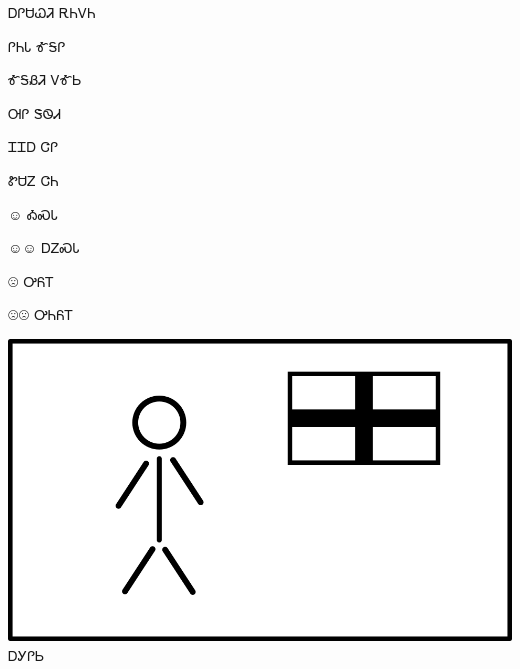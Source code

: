 \documentclass[avery5371]{flashcards}%
\begin{document}

    \begin{flashcard}{\Huge ᎠᎵᏌᏇᏘ}
        \textbf{\Huge} ᎡᏂᏙᏂ
    \end{flashcard}

    \begin{flashcard}{\Huge ᎵᏂᏓ}
        \textbf{\Huge} ᎹᎦᎵ
    \end{flashcard}

    \begin{flashcard}{\Huge ᎹᎦᏰᏘ}
        \textbf{\Huge} ᏙᎹᏏ
    \end{flashcard}

    \begin{flashcard}{\Huge ᎺᎵ}
        \textbf{\Huge} ᏕᏫᏗ
    \end{flashcard}

    \begin{flashcard}{\Huge ᏆᏆᎠ}
        \textbf{\Huge} ᏣᎵ
    \end{flashcard}

    \begin{flashcard}{\Huge ᏑᏌᏃ}
        \textbf{\Huge} ᏣᏂ
    \end{flashcard}


    \begin{flashcard}{\normalfont\Huge\fontsize{128pt}{128pt}\selectfont ☺}
        \Huge ᎣᏍᏓ
    \end{flashcard}

    \begin{flashcard}{\normalfont\Huge\fontsize{128pt}{128pt}\selectfont ☺☺}
        \Huge ᎠᏃᏍᏓ
    \end{flashcard}

    \begin{flashcard}{\normalfont\Huge\fontsize{128pt}{128pt}\selectfont ☹}
        \Huge ᎤᏲᎢ
    \end{flashcard}

    \begin{flashcard}{\normalfont\Huge\fontsize{128pt}{128pt}\selectfont ☹☹}
        \Huge ᎤᏂᏲᎢ
    \end{flashcard}


    \begin{flashcard}{
        \includegraphics[width=0.95\columnwidth,height=.51\columnwidth,keepaspectratio]{../artwork/flags/agilisi-flag}
    }
        \Huge ᎠᎩᎵᏏ
    \end{flashcard}
\end{document}
